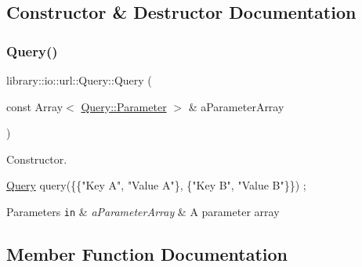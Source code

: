 \subsection{Constructor \& Destructor Documentation}
\mbox{\label{classlibrary_1_1io_1_1url_1_1_query_a6781de8f7b7251f8e17c191434b08039}} 
\subsubsection{\texorpdfstring{Query()}{Query()}}
{\footnotesize\ttfamily library\+::io\+::url\+::\+Query\+::\+Query (\begin{DoxyParamCaption}\item[{const Array$<$ \hyperlink{classlibrary_1_1io_1_1url_1_1_query_1_1_parameter}{Query\+::\+Parameter} $>$ \&}]{a\+Parameter\+Array }\end{DoxyParamCaption})}



Constructor. 


\begin{DoxyCode}
\hyperlink{classlibrary_1_1io_1_1url_1_1_query_a6781de8f7b7251f8e17c191434b08039}{Query} query(\{\{\textcolor{stringliteral}{"Key A"}, \textcolor{stringliteral}{"Value A"}\}, \{\textcolor{stringliteral}{"Key B"}, \textcolor{stringliteral}{"Value B"}\}\}) ;
\end{DoxyCode}



\begin{DoxyParams}[1]{Parameters}
\mbox{\tt in}  & {\em a\+Parameter\+Array} & A parameter array \\
\hline
\end{DoxyParams}


\subsection{Member Function Documentation}
\mbox{\label{classlibrary_1_1io_1_1url_1_1_query_aaaae1184a15d06b061dc38e779fb834e}} 
